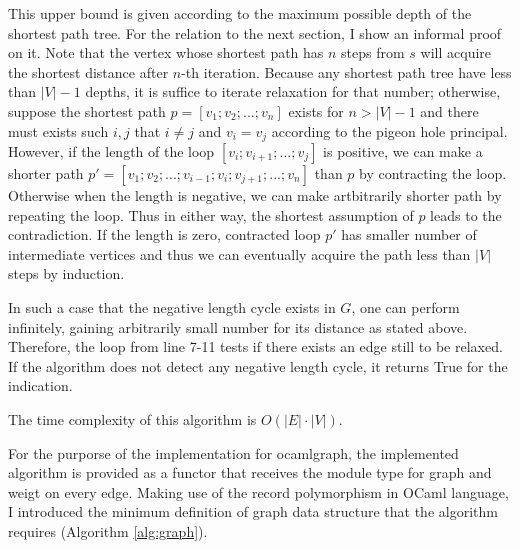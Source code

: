 \documentclass[a4paper,12pt]{article}
\begin{document}
This upper bound is given according to the maximum possible depth of
the shortest path tree. For the relation to the next section, I show
an informal proof on it. Note that the vertex whose shortest path has
$n$ steps from $s$ will acquire the shortest distance after $n$-th
iteration. Because any shortest path tree have less than $|V|-1$
depths, it is suffice to iterate relaxation for that number;
otherwise, suppose the shortest path $p=[v_1;v_2;...;v_n]$ exists for
$n>|V|-1$ and there must exists such $i,j$ that $i\ne j$ and $v_i=v_j$
according to the pigeon hole principal. However, if the length of the
loop $[v_i;v_{i+1};...;v_j]$ is positive, we can make a shorter path
$p'=[v_1;v_2;...;v_{i-1};v_i;v_{j+1};...;v_n]$ than $p$ by contracting
the loop. Otherwise when the length is negative, we can make
artbitrarily shorter path by repeating the loop. Thus in either way,
the shortest assumption of $p$ leads to the contradiction. If the
length is zero, contracted loop $p'$ has smaller number of
intermediate vertices and thus we can eventually acquire the path less
than $|V|$ steps by induction.

In such a case that the negative length cycle exists in $G$, one can
perform \relaxBF infinitely, gaining arbitrarily small number for its
distance as stated above. Therefore, the loop from line 7-11 tests if
there exists an edge still to be relaxed. If the algorithm does not
detect any negative length cycle, it returns True for the indication.

The time complexity of this algorithm is $O(|E|\cdot|V|)$.

\newcommand{\mainBF}{\ensuremath{\mbox{\sc Bellman-Ford}}}
\begin{algorithm}
\caption{$\mainBF(G,s,l)$}\label{alg:bf}
\begin{algorithmic}[1]
\ENDFOR
\ENDFOR
{}
\ENDIF
\ENDFOR
{}
\end{algorithmic}
\end{algorithm}

For the purporse of the implementation for ocamlgraph, the implemented
algorithm is provided as a functor that receives the module type for
graph and weigt on every edge. Making use of the record polymorphism
in OCaml language, I introduced the minimum definition of graph data
structure that the algorithm requires (Algorithm \ref{alg:graph}).
\end{document}
